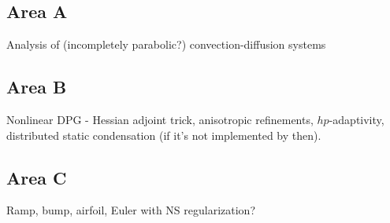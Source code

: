\documentclass{article}
\begin{document}
\subsection{Area A}

Analysis of (incompletely parabolic?) convection-diffusion systems

\subsection{Area B}

Nonlinear DPG - Hessian adjoint trick, anisotropic refinements, $hp$-adaptivity, distributed static condensation (if it's not implemented by then). 

\subsection{Area C}

Ramp, bump, airfoil, Euler with NS regularization?



\end{document}
